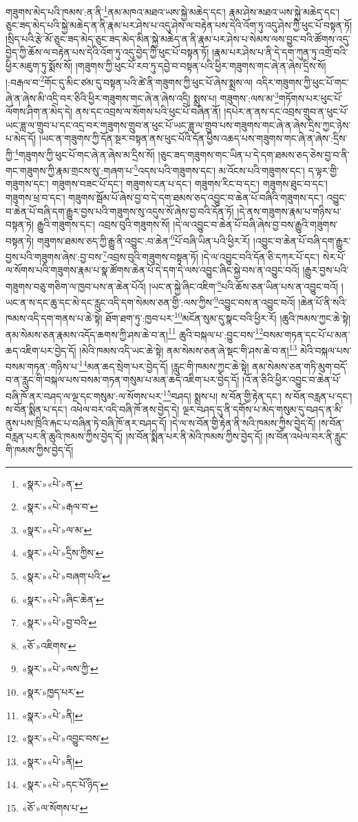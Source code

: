 གཟུགས་མེད་པའི་ཁམས་:ན་ནི་\footnote{«སྣར་»«པེ་»ན་}ནམ་མཁའ་མཐའ་ཡས་སྐྱེ་མཆེད་དང་། རྣམ་ཤེས་མཐའ་ཡས་སྐྱེ་མཆེད་དང་། ཅུང་ཟད་མེད་པའི་སྐྱེ་མཆེད་ན་ནི་རྣམ་པར་ཤེས་པ་འདུ་ཤེས་ལ་བརྟེན་པས་དེའི་འོག་ཏུ་འདུ་ཤེས་ཀྱི་ཕུང་པོ་བསྟན་ཏོ། །སྲིད་པའི་རྩེ་མོ་ཅུང་ཟད་མེད་ཅུང་ཟད་མེད་མིན་སྐྱེ་མཆེད་ན་ནི་རྣམ་པར་ཤེས་པ་སེམས་ལས་བྱུང་བའི་ཚོགས་འདུ་བྱེད་ཀྱི་ཆོས་ལ་བརྟེན་པས་དེའི་འོག་ཏུ་འདུ་བྱེད་ཀྱི་ཕུང་པོ་བསྟན་ཏོ། །རྣམ་པར་ཤེས་པ་ནི་དེ་དག་ཀུན་ཏུ་འགྲོ་བའི་ཕྱིར་མཇུག་ཏུ་སྨོས་སོ། །གཟུགས་ཀྱི་ཕུང་པོ་རབ་ཏུ་དབྱེ་བ་བསྟན་པའི་ཕྱིར་གཟུགས་གང་ཞེ་ན་ཞེས་དྲིས་སོ། །:བརྒལ་བ་\footnote{«སྣར་»«པེ་»རྒལ་བ་}གོང་དུ་མིང་ཙམ་དུ་བསྟན་པའི་ཚེ་ནི་གཟུགས་ཀྱི་ཕུང་པོ་ཞེས་སྨྲས་ལ། འདིར་གཟུགས་ཀྱི་ཕུང་པོ་གང་ཞེ་ན་ཞེས་མི་འདྲི་བར་ཅིའི་ཕྱིར་གཟུགས་གང་ཞེ་ན་ཞེས་འདྲི། སྨྲས་པ། གཟུགས་:ལས་མ་\footnote{«སྣར་»«པེ་»ལ་མ་}གཏོགས་པར་ཕུང་པོ་ལོགས་ཤིག་ན་མེད་དེ། ནས་དང་འབྲས་ལ་སོགས་པའི་ཕུང་པོ་བཞིན་ནོ། །དཔེར་ན་ནས་དང་འབྲས་གྲུབ་ན་ཕུང་པོ་ཡང་ཟླ་ལ་གྲུབ་པ་དང་འདྲ་བར་གཟུགས་གྲུབ་ན་ཕུང་པོ་ཡང་ཟླ་ལ་གྲུབ་པས་གཟུགས་གང་ཞེ་ན་ཞེས་དྲིས་ཀྱང་ཉེས་པ་མེད་དོ། །ཡང་ན་གཟུགས་ཀྱི་དོན་སྔར་བསྟན་ནས་ཕུང་པོའི་དོན་ཕྱིས་འཆད་པས་གཟུགས་གང་ཞེ་ན་ཞེས་:དྲིས་ཀྱི་\footnote{«སྣར་»«པེ་»དྲིས་ཀྱིས་}གཟུགས་ཀྱི་ཕུང་པོ་གང་ཞེ་ན་ཞེས་མ་དྲིས་སོ། །ཅུང་ཟད་གཟུགས་གང་ཡིན་པ་དེ་དག་ཐམས་ཅད་ཅེས་བྱ་བ་ནི་གང་གཟུགས་ཀྱི་རྣམ་གྲངས་སུ་:གཞག་པ་\footnote{«སྣར་»«པེ་»བཞག་པའི་}འདས་པའི་གཟུགས་དང་། མ་འོངས་པའི་གཟུགས་དང་། ད་ལྟར་གྱི་གཟུགས་དང་། གཟུགས་བཟང་པོ་དང་། གཟུགས་ངན་པ་དང་། གཟུགས་རིང་བ་དང་། གཟུགས་ཐུང་བ་དང་། གཟུགས་ཕྲ་བ་དང་། གཟུགས་སྦོམ་པོ་ཞེས་བྱ་བ་དེ་དག་ཐམས་ཅད་འབྱུང་བ་ཆེན་པོ་བཞིའི་གཟུགས་དང་། འབྱུང་བ་ཆེན་པོ་བཞི་དག་རྒྱུར་བྱས་པའི་གཟུགས་སུ་འདུས་སོ་ཞེས་བྱ་བའི་དོན་ཏོ། །དེ་ནས་གཟུགས་རྣམ་པ་གཉིས་པ་བསྟན་ཏེ། རྒྱུའི་གཟུགས་དང་། འབྲས་བུའི་གཟུགས་སོ། །དེ་ལ་འབྱུང་བ་ཆེན་པོ་བཞི་ཞེས་བྱ་བས་རྒྱུའི་གཟུགས་བསྟན་ཏེ། གཟུགས་ཐམས་ཅད་ཀྱི་རྒྱུ་ནི་འབྱུང་:བ་ཆེན་\footnote{«སྣར་»«པེ་»ཞིང་ཆེན་}པོ་བཞི་ཡིན་པའི་ཕྱིར་རོ། །འབྱུང་བ་ཆེན་པོ་བཞི་དག་རྒྱུར་བྱས་པའི་གཟུགས་ཞེས་:བྱ་བས་\footnote{«སྣར་»«པེ་»བྱ་བའི་}འབྲས་བུའི་གཟུགས་བསྟན་ཏོ། །དེ་ལ་འབྱུང་བའི་དོན་ཅི་དཀར་པོ་དང་། སེར་པོ་ལ་སོགས་པའི་གཟུགས་རྣམ་པ་སྣ་ཚོགས་ཆེན་པོ་དེ་དག་དེ་ལས་འབྱུང་ཞིང་སྐྱེ་བས་ན་འབྱུང་བའོ། །རྒྱུར་བྱས་པའི་གཟུགས་བཅུ་གཅིག་ལ་ཁྱབ་པས་ན་ཆེན་པོའོ། །ཡང་ན་སྐྱེ་ཞིང་འཇིག་\footnote{«ཅོ་»འཇིགས་}པའི་ཆོས་ཅན་ཡིན་པས་ན་འབྱུང་བའོ། །ཡང་ན་ས་དང་ཆུ་དང་མེ་དང་རླུང་འདི་དག་སེམས་ཅན་གྱི་:ལས་ཀྱིས་\footnote{«སྣར་»«པེ་»ལས་ཀྱི་}འབྱུང་བས་ན་འབྱུང་བའོ། །ཆེན་པོ་ནི་སའི་ཁམས་འདི་དག་གནས་པ་ཆེ་སྟེ། ཐོག་ཐག་ཏུ་:ཁྱབ་པར་\footnote{«སྣར་»ཁྱད་པར་}མངོན་སུམ་དུ་སྣང་བའི་ཕྱིར་རོ། །ཆུའི་ཁམས་ཀྱང་ཆེ་སྟེ། ནམ་སེམས་ཅན་རྣམས་འདོད་ཆགས་ཀྱི་ཤས་ཆེ་བ་ན།\footnote{«སྣར་»«པེ་»ནི།} ཆུའི་བསྐལ་པ་:བྱུང་བས་\footnote{«སྣར་»«པེ་»འབྱུང་བས་}བསམ་གཏན་དང་པོ་པ་མན་ཆད་འཇིག་པར་བྱེད་དོ། །མེའི་ཁམས་འདི་ཡང་ཆེ་སྟེ། ནམ་སེམས་ཅན་ཞེ་སྡང་གི་ཤས་ཆེ་བ་ན།\footnote{«སྣར་»«པེ་»ནི།} མེའི་བསྐལ་པས་བསམ་གཏན་:གཉིས་པ་\footnote{«སྣར་»«པེ་»དང་པོ་ཉིད་}མན་ཆད་སྲེག་པར་བྱེད་དོ། །རླུང་གི་ཁམས་ཀྱང་ཆེ་སྟེ། ནམ་སེམས་ཅན་གཏི་མུག་བདོ་བ་ན་རླུང་གི་བསྐལ་པས་བསམ་གཏན་གསུམ་པ་མན་ཆད་འཇིག་པར་བྱེད་དོ། །འོ་ན་ཅིའི་ཕྱིར་འབྱུང་བ་ཆེན་པོ་བཞི་ཁོ་ནར་བཤད་ལ་ལྔ་དང་གསུམ་:ལ་སོགས་པར་\footnote{«ཅོ་»ལ་སོགས་པ་}བཤད། སྨྲས་པ། ས་བོན་གྱི་རྟེན་དང་། ས་བོན་བརླན་པ་དང་། ས་བོན་སྨིན་པ་དང་། འཕེལ་བར་འདི་བཞི་ཁོ་ནས་བྱེད་དེ། ལྔར་བཤད་དུ་ནི་དགོས་པ་མེད་གསུམ་དུ་བཤད་ན་མི་ནུས་པས་ཁྲིའི་རྐང་པ་བཞིན་ཏེ་བཞི་ཁོ་ནར་བཤད་དོ། །དེ་ལ་ས་བོན་གྱི་རྟེན་ནི་སའི་ཁམས་ཀྱིས་བྱེད་དོ། །ས་བོན་བརླན་པར་ནི་ཆུའི་ཁམས་ཀྱིས་བྱེད་དོ། །ས་བོན་སྨིན་པར་ནི་མེའི་ཁམས་ཀྱིས་བྱེད་དོ། །ས་བོན་འཕེལ་བར་ནི་རླུང་གི་ཁམས་ཀྱིས་བྱེད་དོ། 
